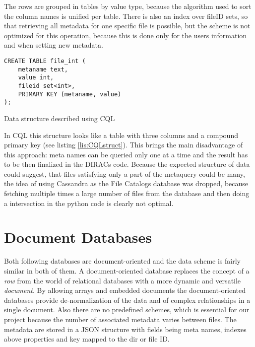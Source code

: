 The rows are grouped in tables by value type, because the algorithm used to sort the
column names is unified per table. There is also an index over fileID sets, 
so that retrieving all metadata for one specific file is possible, but the scheme is 
not optimized for this operation, because this is done only for the users information and
when setting new metadata.

\begin{listing}
\begin{verbatim}
CREATE TABLE file_int (
    metaname text,
    value int,
    fileid set<int>,
    PRIMARY KEY (metaname, value)
);
\end{verbatim}
\caption{Data structure described using CQL}
\label{lis:CQLstruct}
\end{listing}

In CQL this structure looks like a table with three columns and a compound primary key (see listing 
\ref{lis:CQLstruct}). 
This brings the main disadvantage of this approach: meta names can be queried only one at a time and
the result has to be then finalized in the DIRACs code. Because the expected structure of data could
suggest, that files satisfying only a part of the metaquery could be many, the idea of using 
Cassandra as the File Catalogs database was dropped, because fetching multiple times a large number of 
files from the database and then doing a intersection in the python code is clearly not optimal. 



\section{Document Databases}

Both following databases are document-oriented and the data scheme is fairly similar in both
of them. A document-oriented database replaces the concept of a \textit{row} from the world of relational 
databases with a more dynamic and versatile \textit{document}. By allowing arrays and embedded documents the 
document-oriented databases provide de-normalization of the data and of complex 
relationships in a single document. Also there are no predefined schemes, which is essential for our project because 
the number of associated metadata varies between 
files. The metadata are stored in a JSON structure with fields being meta names, indexes above properties and key 
mapped to the dir or file ID.


